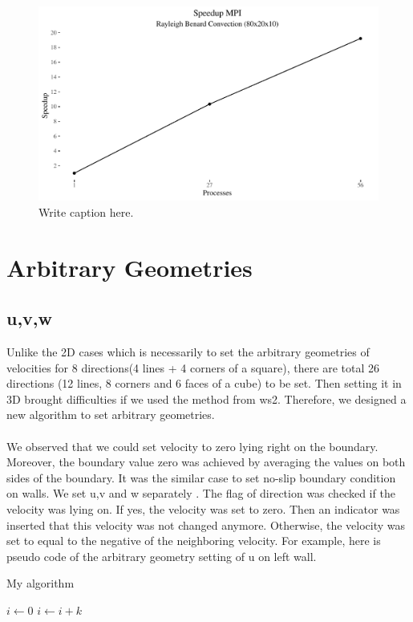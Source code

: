 \documentclass{article}%
\begin{document}
\begin{figure}[htb]
\centering
\includegraphics[width=1\linewidth]{../tests/graphs/speedup_MPI.pdf}
\caption{Write caption here.}
\label{fig:speedup_MPI}
\end{figure}




\section{Arbitrary Geometries}
\subsection{u,v,w}
Unlike the 2D cases which is necessarily to set the arbitrary geometries of velocities for 8 directions(4 lines + 4 corners of a square), there are total 26 directions (12 lines, 8 corners and 6 faces of a cube) to be set. Then setting it in 3D brought difficulties if we used the method from ws2.  Therefore, we designed a new algorithm to set arbitrary geometries.\\
\\
We observed that we could set velocity to zero lying right on the boundary. Moreover, the boundary value zero was achieved by averaging the values on both sides of the boundary. It was the similar case to set no-slip boundary condition on walls.  We set u,v and w separately . The flag of direction was checked if the velocity was lying on. If yes, the velocity was set to zero. Then an indicator was inserted that this velocity was not changed anymore. Otherwise, the velocity was set to equal to the negative of the neighboring velocity.  For example, here is pseudo code of the arbitrary geometry setting of u on left wall.
\begin{algorithm}
\caption{My algorithm}\label{euclid}
\begin{algorithmic}
    \State $i\gets 0$
\Else
        \State $i\gets i+k$
    \EndIf
\EndIf
\end{algorithmic}
\end{algorithm}
\end{document}
